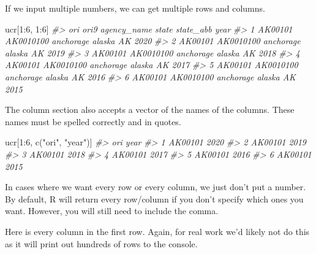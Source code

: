 \documentclass[
]{krantz}
\makeatletter
\newenvironment{Shaded}{\begin{snugshade}}{\end{snugshade}}
\newcommand{\CommentTok}[1]{\textcolor[rgb]{0.37,0.37,0.37}{\textit{#1}}}
\newcommand{\DecValTok}[1]{\textcolor[rgb]{0.06,0.06,0.06}{#1}}
\newcommand{\FunctionTok}[1]{\textcolor[rgb]{0,0,0}{#1}}
\newcommand{\NormalTok}[1]{#1}
\newcommand{\SpecialCharTok}[1]{\textcolor[rgb]{0,0,0}{#1}}
\newcommand{\StringTok}[1]{\textcolor[rgb]{0.5,0.5,0.5}{#1}}
\newenvironment{kframe}{%
\medskip{}
\setlength{\fboxsep}{.8em}
 \def\at@end@of@kframe{}%
 \ifinner\ifhmode%
  \def\at@end@of@kframe{\end{minipage}}%
  \begin{minipage}{\columnwidth}%
 \fi\fi%
 \def\FrameCommand##1{\hskip\@totalleftmargin \hskip-\fboxsep
 \colorbox{shadecolor}{##1}\hskip-\fboxsep
     \hskip-\linewidth \hskip-\@totalleftmargin \hskip\columnwidth}%
 \MakeFramed {\advance\hsize-\width
   \@totalleftmargin\z@ \linewidth\hsize
   \@setminipage}}%
 {\par\unskip\endMakeFramed%
 \at@end@of@kframe}
\renewenvironment{Shaded}{\begin{kframe}}{\end{kframe}}
\makeatother
\begin{document}
If we input multiple numbers, we can get multiple rows and columns.

\begin{Shaded}
\begin{Highlighting}[]
\NormalTok{ucr[}\DecValTok{1}\SpecialCharTok{:}\DecValTok{6}\NormalTok{, }\DecValTok{1}\SpecialCharTok{:}\DecValTok{6}\NormalTok{]}
\CommentTok{\#\textgreater{}       ori      ori9 agency\_name  state state\_abb year}
\CommentTok{\#\textgreater{} 1 AK00101 AK0010100   anchorage alaska        AK 2020}
\CommentTok{\#\textgreater{} 2 AK00101 AK0010100   anchorage alaska        AK 2019}
\CommentTok{\#\textgreater{} 3 AK00101 AK0010100   anchorage alaska        AK 2018}
\CommentTok{\#\textgreater{} 4 AK00101 AK0010100   anchorage alaska        AK 2017}
\CommentTok{\#\textgreater{} 5 AK00101 AK0010100   anchorage alaska        AK 2016}
\CommentTok{\#\textgreater{} 6 AK00101 AK0010100   anchorage alaska        AK 2015}
\end{Highlighting}
\end{Shaded}

The column section also accepts a vector of the names of the columns. These names must be spelled correctly and in quotes.

\begin{Shaded}
\begin{Highlighting}[]
\NormalTok{ucr[}\DecValTok{1}\SpecialCharTok{:}\DecValTok{6}\NormalTok{, }\FunctionTok{c}\NormalTok{(}\StringTok{"ori"}\NormalTok{, }\StringTok{"year"}\NormalTok{)]}
\CommentTok{\#\textgreater{}       ori year}
\CommentTok{\#\textgreater{} 1 AK00101 2020}
\CommentTok{\#\textgreater{} 2 AK00101 2019}
\CommentTok{\#\textgreater{} 3 AK00101 2018}
\CommentTok{\#\textgreater{} 4 AK00101 2017}
\CommentTok{\#\textgreater{} 5 AK00101 2016}
\CommentTok{\#\textgreater{} 6 AK00101 2015}
\end{Highlighting}
\end{Shaded}

In cases where we want every row or every column, we just don't put a number. By default, R will return every row/column if you don't specify which ones you want. However, you will still need to include the comma.

Here is every column in the first row. Again, for real work we'd likely not do this as it will print out hundreds of rows to the console.
\end{document}
